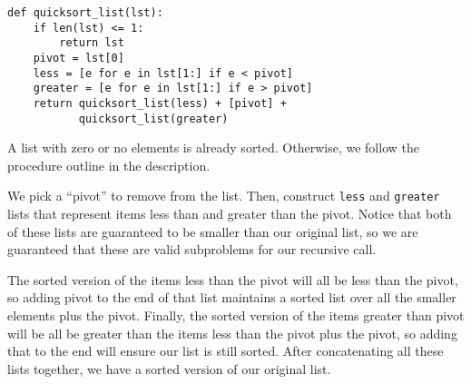 \begin{solution}
\begin{lstlisting}
def quicksort_list(lst):
    if len(lst) <= 1:
        return lst
    pivot = lst[0]
    less = [e for e in lst[1:] if e < pivot]
    greater = [e for e in lst[1:] if e > pivot]
    return quicksort_list(less) + [pivot] +
           quicksort_list(greater)
\end{lstlisting}

A list with zero or no elements is already sorted. Otherwise, we follow the
procedure outline in the description.

We pick a ``pivot'' to remove from the list. Then, construct \texttt{less} and
\texttt{greater} lists that represent items less than and greater than the
pivot. Notice that both of these lists are guaranteed to be smaller than our
original list, so we are guaranteed that these are valid subproblems for our
recursive call.

The sorted version of the items less than the pivot will all be less than the
pivot, so adding pivot to the end of that list maintains a sorted list over all
the smaller elements plus the pivot. Finally, the sorted version of the items
greater than pivot will be all be greater than the items less than the pivot
plus the pivot, so adding that to the end will ensure our list is still sorted.
After concatenating all these lists together, we have a sorted version of our
original list.

\end{solution}

